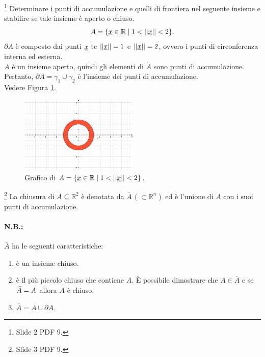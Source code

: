 \begin{example}\label{ex:norma_in_(1,2)}\footnote{Slide 2 PDF 9.}
    Determinare i punti di accumulazione e quelli di frontiera nel seguente insieme e stabilire se tale insieme è aperto o chiuso.
    \begin{equation*}
        A=\{\uline x\in\mathbb R\;|\; 1<||\uline x||<2\}.
    \end{equation*}
    $\partial A$ è composto dai punti $\uline x$ tc $||\uline x||=1$ e $||\uline x||=2$, ovvero i punti di circonferenza interna ed esterna.\\
    $A$ è un insieme aperto, quindi gli elementi di $\mathring A$ sono punti di accumulazione. Pertanto, $\partial A=\gamma_1\cup\gamma_2$ è l'insieme dei punti di accumulazione.\\
    Vedere Figura \ref{fig:esempio_punti_accumulazione}.
    \begin{figure}
    \centering
    \includegraphics[width=0.5\textwidth]{Analisi2/figures/x2plusy2.jpg}
    \caption{Grafico di $A=\{\uline x\in\mathbb R\;|\; 1<||\uline x||<2\}$.}\label{fig:esempio_punti_accumulazione}
    \end{figure}
\end{example}

\begin{definition}\footnote{Slide 3 PDF 9.}
    La chiusura di $A\subseteq\mathbb R^2$ è denotata da $\bar A\, (\subset\mathbb R^n)$ ed è l'unione di $A$ con i suoi punti di accumulazione.
\end{definition}

\paragraph{N.B.:} $\bar A$ ha le seguenti caratteristiche:
\begin{enumerate}
    \item è un insieme chiuso.
    \item è il più piccolo chiuso che contiene $A$. È possibile dimostrare che $A\in\bar A$ e se $\Bar A=A$ allora $A$ è chiuso.
    \item $\bar A=A\cup\partial A$.
\end{enumerate}

